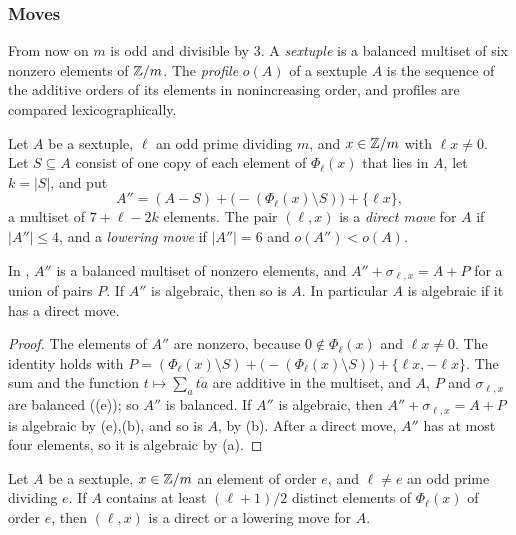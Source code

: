 \subsubsection*{Moves}
From now on $m$ is odd and divisible by $3$. A \emph{sextuple} is a balanced
multiset of six nonzero elements of $\mathbb{Z}/m$. The \emph{profile} $o(A)$ of a
sextuple $A$ is the sequence of the additive orders of its elements in
nonincreasing order, and profiles are compared lexicographically.

\begin{definition}\label{def:move}
Let $A$ be a sextuple, $\ell$ an odd prime dividing $m$, and $x\in\mathbb{Z}/m$
with $\ell x\ne0$. Let $S\subseteq A$ consist of one copy of each element of
$\Phi_{\ell}(x)$ that lies in $A$, let $k=|S|$, and put
\[
  A''=(A-S)+\bigl(-(\Phi_{\ell}(x)\setminus S)\bigr)+\{\ell x\},
\]
a multiset of $7+\ell-2k$ elements. The pair $(\ell,x)$ is a \emph{direct
move} for $A$ if $|A''|\le4$, and a \emph{lowering move} if $|A''|=6$ and
$o(A'')<o(A)$.
\end{definition}

\begin{lemma}\label{lem:move}
In , $A''$ is a balanced multiset of nonzero elements, and
$A''+\sigma_{\ell,x}=A+P$ for a union of pairs $P$. If $A''$ is algebraic,
then so is $A$. In particular $A$ is algebraic if it has a direct move.
\end{lemma}

\begin{proof}
The elements of $A''$ are nonzero, because $0\notin\Phi_{\ell}(x)$ and $\ell
x\ne0$. The identity holds with $P=(\Phi_{\ell}(x)\setminus S)+
\bigl(-(\Phi_{\ell}(x)\setminus S)\bigr)+\{\ell x,-\ell x\}$. The sum and the
function $t\mapsto\sum_{a}\overline{ta}$ are additive in the multiset, and
$A$, $P$ and $\sigma_{\ell,x}$ are balanced ((e)); so
$A''$ is balanced. If $A''$ is algebraic, then $A''+\sigma_{\ell,x}=A+P$ is
algebraic by (e),(b), and so is $A$, by
(b). After a direct move, $A''$ has at most four
elements, so it is algebraic by (a).
\end{proof}

\begin{lemma}\label{lem:movecrit}
Let $A$ be a sextuple, $x\in\mathbb{Z}/m$ an element of order $e$, and $\ell\ne e$
an odd prime dividing $e$. If $A$ contains at least $(\ell+1)/2$ distinct
elements of $\Phi_{\ell}(x)$ of order $e$, then $(\ell,x)$ is a direct or a
lowering move for $A$.
\end{lemma}


